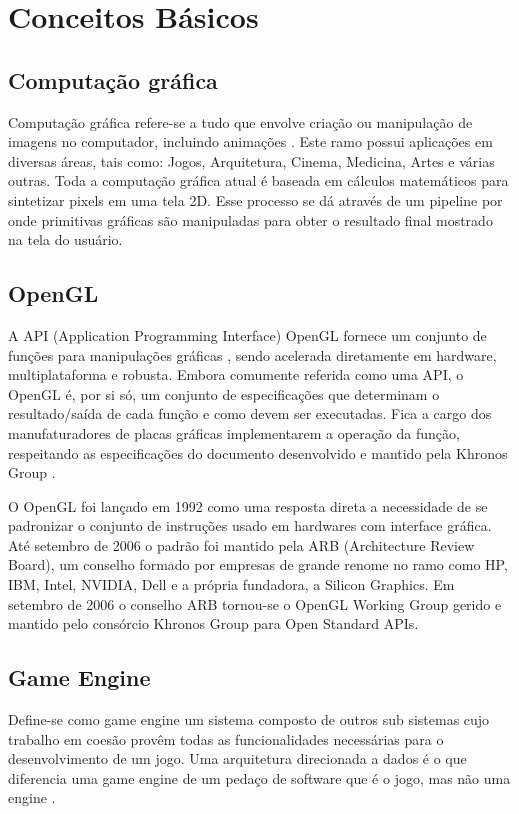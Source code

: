 \documentclass[12pt, 
openright, 
oneside, 
a4paper,    
brazil]{facom-ufu-abntex2}
\begin{document}

\chapter{Conceitos Básicos}
\label{cap:revisaoBiblio}

\section{Computação gráfica}
Computação gráfica refere-se a tudo que envolve criação ou manipulação de imagens no computador, incluindo animações \cite{ComputerGraphicsIntro}. Este ramo possui aplicações em diversas áreas, tais como: Jogos, Arquitetura, Cinema, Medicina, Artes e várias outras. Toda a computação gráfica atual é baseada em cálculos matemáticos para sintetizar pixels em uma tela 2D. Esse processo se dá através de um pipeline por onde primitivas gráficas são manipuladas para obter o resultado final mostrado na tela do usuário.
\section{OpenGL}
A API (Application Programming Interface) OpenGL fornece um conjunto de funções para manipulações gráficas \cite{LearnOpenGL}, sendo acelerada diretamente em hardware, multiplataforma e robusta. Embora comumente referida como uma API, o OpenGL é, por si só, um conjunto de especificações que determinam o resultado/saída de cada função e como devem ser executadas. Fica a cargo dos manufaturadores de placas gráficas implementarem a operação da função, respeitando as especificações do documento desenvolvido e mantido pela Khronos Group \cite{KhronosOpenGLSpecification}.

 O OpenGL foi lançado em 1992 como uma resposta direta a necessidade de se padronizar o conjunto de instruções usado em hardwares com interface gráfica. Até setembro de 2006 o padrão foi mantido pela ARB (Architecture Review Board), um conselho formado por empresas de grande renome no ramo como HP, IBM, Intel, NVIDIA, Dell e a própria fundadora, a Silicon Graphics. Em setembro de 2006 o conselho ARB tornou-se o OpenGL Working Group gerido e mantido pelo consórcio Khronos Group para Open Standard APIs\cite{OpenGLAbout}.
 
\section{Game Engine}
Define-se como game engine um sistema composto de outros sub sistemas cujo trabalho em coesão provêm todas as funcionalidades necessárias para o desenvolvimento de um jogo. Uma arquitetura direcionada a dados é o que diferencia uma game engine de um pedaço de software que é o jogo, mas não uma engine \cite{GameEngineArchitecture}. 
\end{document}
